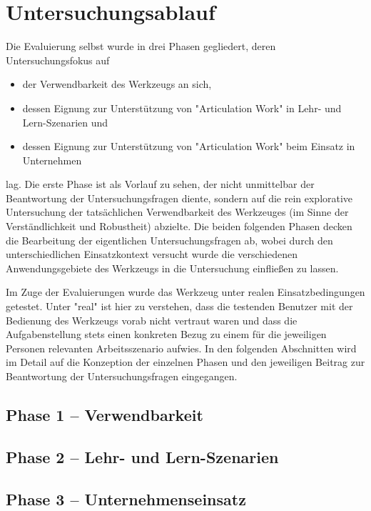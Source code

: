 
\section{Untersuchungsablauf} %
\label{sec:untersuchungsablauf}

Die Evaluierung selbst wurde in drei Phasen gegliedert, deren Untersuchungsfokus auf 
\begin{itemize}
	\item der Verwendbarkeit des Werkzeugs an sich,  
	\item dessen Eignung zur Unterstützung von "Articulation Work" in Lehr- und Lern-Szenarien und
	\item dessen Eignung zur Unterstützung von "Articulation Work" beim Einsatz in Unternehmen
\end{itemize}
lag. Die erste Phase ist als Vorlauf zu sehen, der nicht unmittelbar der Beantwortung der Untersuchungsfragen diente, sondern auf die rein explorative Untersuchung der tatsächlichen Verwendbarkeit des Werkzeuges (im Sinne der Verständlichkeit und Robustheit) abzielte. Die beiden folgenden Phasen decken die Bearbeitung der eigentlichen Untersuchungsfragen ab, wobei durch den unterschiedlichen Einsatzkontext versucht wurde die verschiedenen Anwendungsgebiete des Werkzeugs in die Untersuchung einfließen zu lassen.

Im Zuge der Evaluierungen wurde das Werkzeug unter realen Einsatzbedingungen getestet. Unter "real" ist hier zu verstehen, dass die testenden Benutzer mit der Bedienung des Werkzeugs vorab nicht vertraut waren und dass die Aufgabenstellung stets einen konkreten Bezug zu einem für die jeweiligen Personen relevanten Arbeitsszenario aufwies. In den folgenden Abschnitten wird im Detail auf die Konzeption der einzelnen Phasen und den jeweiligen Beitrag zur Beantwortung der Untersuchungsfragen eingegangen.

\subsection{Phase 1 – Verwendbarkeit} %
\label{sub:phase_1_verwendbarkeit}


\subsection{Phase 2 – Lehr- und Lern-Szenarien} %
\label{sub:phase_2_lehr_und_lern_szenarien}



\subsection{Phase 3 – Unternehmenseinsatz} %
\label{sub:phase_3_unternehmenseinsatz}


